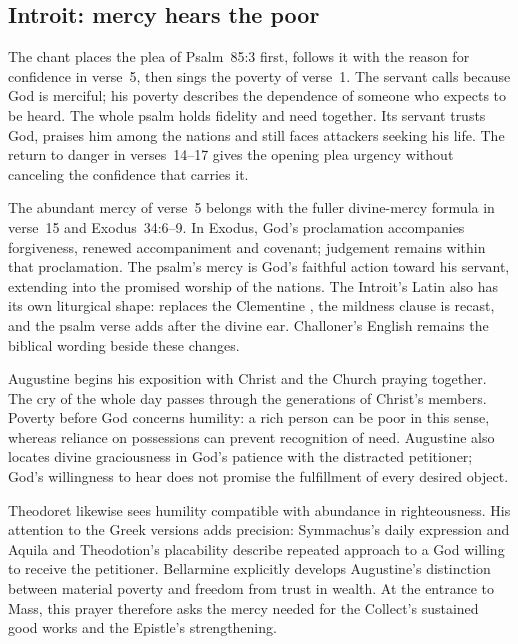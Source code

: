 \clearpage
\subsection*{Introit: mercy hears the poor}
The chant places the plea of Psalm~85:3 first, follows it with the reason for confidence in verse~5, then sings the poverty of verse~1. The servant calls because God is merciful; his poverty describes the dependence of someone who expects to be heard. The whole psalm holds fidelity and need together. Its servant trusts God, praises him among the nations and still faces attackers seeking his life. The return to danger in verses~14--17 gives the opening plea urgency without canceling the confidence that carries it.

The abundant mercy of verse~5 belongs with the fuller divine-mercy formula in verse~15 and Exodus~34:6--9. In Exodus, God's proclamation accompanies forgiveness, renewed accompaniment and covenant; judgement remains within that proclamation. The psalm's mercy is God's faithful action toward his servant, extending into the promised worship of the nations. The Introit's Latin also has its own liturgical shape:  replaces the Clementine , the mildness clause is recast, and the psalm verse adds  after the divine ear. Challoner's English remains the biblical wording beside these changes.

Augustine begins his exposition with Christ and the Church praying together. The cry of the whole day passes through the generations of Christ's members. Poverty before God concerns humility: a rich person can be poor in this sense, whereas reliance on possessions can prevent recognition of need. Augustine also locates divine graciousness in God's patience with the distracted petitioner; God's willingness to hear does not promise the fulfillment of every desired object. 

Theodoret likewise sees humility compatible with abundance in righteousness. His attention to the Greek versions adds precision: Symmachus's daily expression and Aquila and Theodotion's placability describe repeated approach to a God willing to receive the petitioner. Bellarmine explicitly develops Augustine's distinction between material poverty and freedom from trust in wealth. At the entrance to Mass, this prayer therefore asks the mercy needed for the Collect's sustained good works and the Epistle's strengthening. 

